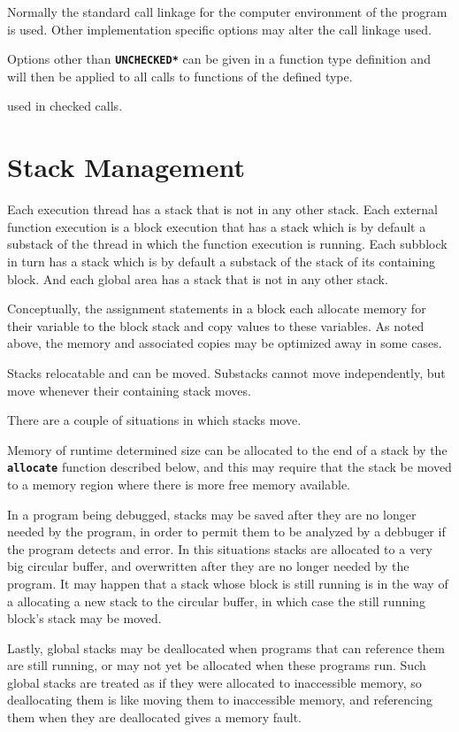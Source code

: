 \documentclass[12pt]{article}
\newcommand{\TT}[1]{{\tt \bfseries #1}}
\begin{document}
Normally the standard call linkage for the computer environment of
the program is used.  Other implementation specific options
may alter the call linkage used.

Options other than \TT{*UNCHECKED*} can be given in a function type
definition and will then be applied to all calls to functions of the
defined type.

used in checked calls.


\section{Stack Management}
\label{STACK-MANAGEMENT}

Each execution thread has a stack that is not in any other
stack.  Each external function
execution is a block execution that has a stack which is
by default a substack of the thread in which the function
execution is running.  Each subblock in turn has a stack
which is by default a substack of the stack of its containing block.
And each global area has a stack that is not in any other stack.

Conceptually, the assignment statements in a block each allocate memory for
their variable to the block stack and copy values to these
variables.  As noted above, the memory and associated copies may be
optimized away in some cases.

Stacks relocatable and can be moved.  Substacks cannot move independently,
but move whenever their containing stack moves.

There are a couple of situations in which stacks move.

Memory of runtime determined size can be allocated to the end of
a stack by the \TT{allocate} function described below, and this may
require that the stack be moved to a memory region where there is
more free memory available.

In a program being debugged, stacks may be saved after they are no
longer needed by the program, in order to permit them to be analyzed
by a debbuger if the program detects and error.  In this situations
stacks are allocated to a very big circular buffer, and overwritten
after they are no longer needed by the program.  It may happen that
a stack whose block is still running is in the way of a allocating
a new stack to the circular buffer, in which case the still running
block's stack may be moved.

Lastly, global stacks may be deallocated when programs that
can reference them are still running, or may not yet be allocated
when these programs run.  Such global stacks are treated as if
they were allocated to inaccessible memory, so deallocating them
is like moving them to inaccessible memory, and referencing
them when they are deallocated gives a memory fault.
\end{document}
